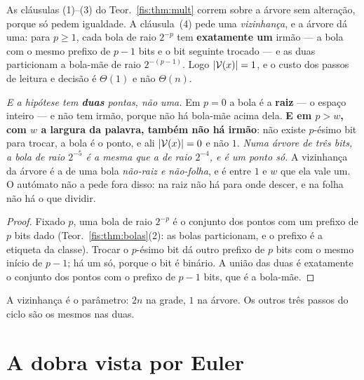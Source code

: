 \documentclass[livro.tex]{subfiles}
\begin{document}
\begin{teorema}\label{fis:thm:vizarvore}
As cláusulas (1)--(3) do Teor.~\ref{fis:thm:mult} correm sobre a árvore sem
alteração, porque só pedem igualdade. A cláusula~(4) pede uma \emph{vizinhança},
e a árvore dá uma: para $p\ge1$, cada bola de raio $2^{-p}$ tem \textbf{exatamente
um} irmão --- a bola com o mesmo prefixo de $p-1$ bits e o bit seguinte trocado ---
e as duas particionam a bola-mãe de raio $2^{-(p-1)}$. Logo
$\lvert \mathcal{V}(x)\rvert=1$, e o custo dos passos de leitura e decisão é $\Theta(1)$
e não $\Theta(n)$.

\medskip\noindent\emph{E a hipótese tem \textbf{duas} pontas, não uma.} Em $p=0$
a bola é a \textbf{raiz} --- o espaço inteiro --- e não tem irmão, porque não há
bola-mãe acima dela. \textbf{E em $p>w$, com $w$ a largura da palavra, também
não há irmão}: não existe $p$-ésimo bit para trocar, a bola é o ponto, e ali
$\lvert \mathcal{V}(x)\rvert=0$ e não $1$. \emph{Numa árvore de três bits, a bola de raio
$2^{-5}$ é a mesma que a de raio $2^{-4}$, e é um ponto só.} A vizinhança da
árvore é a de uma bola \emph{não-raiz e não-folha}, e é entre $1$ e $w$ que ela
vale um. O autómato não a pede fora disso: na raiz não há para onde descer, e na
folha não há o que dividir.
\end{teorema}

\begin{proof}
Fixado $p$, uma bola de raio $2^{-p}$ é o conjunto dos pontos com um prefixo de
$p$ bits dado (Teor.~\ref{fis:thm:bolas}(2): as bolas particionam, e o prefixo é
a etiqueta da classe). Trocar o $p$-ésimo bit dá outro prefixo de $p$ bits com o
mesmo início de $p-1$; há um só, porque o bit é binário. A união das duas é
exatamente o conjunto dos pontos com o prefixo de $p-1$ bits, que é a bola-mãe.
\end{proof}

\medskip\noindent A vizinhança é o parâmetro: $2n$ na grade, $1$ na árvore. Os
outros três passos do ciclo são os mesmos nas duas.


\section{A dobra vista por Euler}\label{fis:euler}
\end{document}
